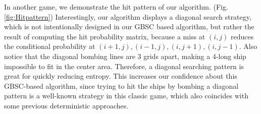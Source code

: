In another game, we demonstrate the hit pattern of our algorithm. (Fig.\ref{fig:Hitpattern}) Interestingly, our algorithm displays a diagonal search strategy, which is not intentionally designed in our GBSC based algorithm, but rather the result of computing the hit probability matrix, because a miss at $(i,j)$ reduces the conditional probability at $(i+1,j), (i-1,j),(i,j+1),(i,j-1)$. Also notice that the diagonal bombing lines are 3 grids apart, making a 4-long ship impossible to fit in the center area. Therefore, a diagonal searching pattern is great for quickly reducing entropy. This increases our confidence about this GBSC-based algorithm, since trying to hit the ships by bombing a diagonal pattern is a well-known strategy in this classic game, which also coincides with some previous deterministic approaches\cite{Rodin}.

